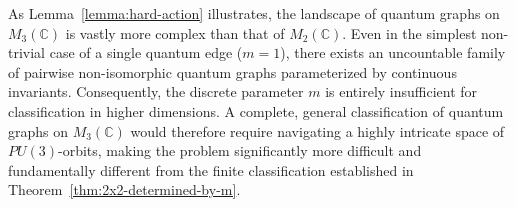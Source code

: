 As Lemma~\ref{lemma:hard-action} illustrates, the landscape of
quantum graphs on \( M_3(\mathbb{C}) \) is vastly more complex than
that of \( M_2(\mathbb{C}) \). Even in the simplest non-trivial case
of a single quantum edge (\( m=1 \)), there exists an uncountable
family of pairwise non-isomorphic quantum graphs parameterized by
continuous invariants. Consequently, the discrete parameter \( m \)
is entirely insufficient for classification in higher dimensions. A
complete, general classification of quantum graphs on \(
M_3(\mathbb{C}) \) would therefore require navigating a highly
intricate space of \( PU(3) \)-orbits, making the problem
significantly more difficult and fundamentally different from the
finite classification established in Theorem~\ref{thm:2x2-determined-by-m}.

